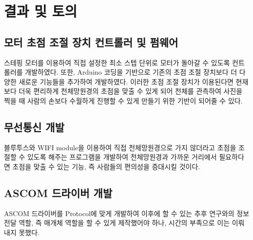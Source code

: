 \section{결과 및 토의}

\subsection{모터 초점 조절 장치 컨트롤러 및 펌웨어}

스테핑 모터를 이용하여 직접 설정한 최소 스텝 단위로 모터가 돌아갈 수 있도록 컨트롤러를 개발하였다. 또한, Arduino 코딩을 기반으로 기존의 초점 조절 장치보다 더 다양한 새로운 기능들을 추가하여 개발하였다. 이러한 초점 조절 장치가 이용된다면 현재보다 더욱 편리하게 천체망원경의 초점을 맞출 수 있게 되어 천체를 관측하여 사진을 찍을 때 사람의 손보다 수월하게 진행할 수 있게 만들기 위한 기반이 되어줄 수 있다.

\subsection{무선통신 개발}

블루투스와 WIFI module을 이용하여 직접 천체망원경으로 가지 않더라고 초점을 조절할 수 있도록 해주는 프로그램을 개발하여 천체망원경과 가까운 거리에서 필요하다면 초점을 맞출 수 있는 기능, 즉 사람들의 편의성을 증대시킬 것이다.

\subsection{ASCOM 드라이버 개발}

ASCOM 드라이버를 Protocol에 맞게 개발하여 이후에 할 수 있는 추후 연구와의 정보 전달 역할, 즉 매개체 역할을 할 수 있게 제작했어야 하나, 시간의 부족으로 이는 이뤄내지 못했다.
